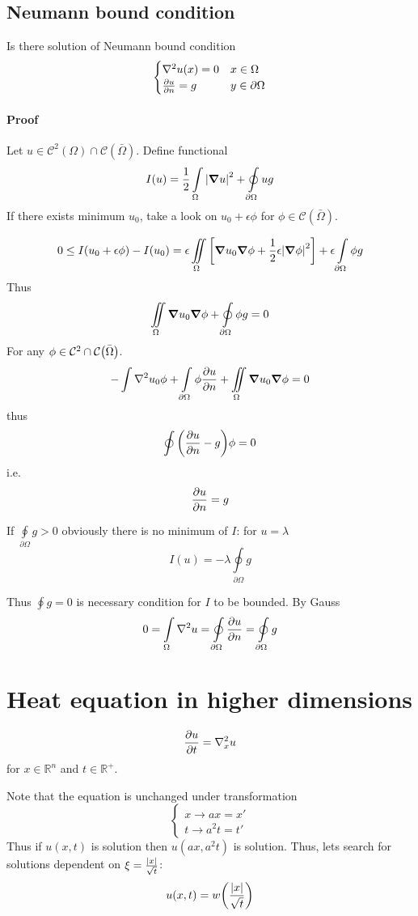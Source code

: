 \subsection{Neumann bound condition}
Is there solution of Neumann bound condition
$$\begin{cases}
\laplacian{u} (x) = 0 & x \in \Omega\\
\pdv{u}{n} (y)= g & y\in \partial \Omega
\end{cases}$$
\paragraph{Proof}
Let $ u \in \mathcal{C}^2(\Omega) \cap \mathcal{C} (\bar{\Omega})$. Define functional
$$I(u)  = \frac{1}{2} \int\limits_{\Omega} \abs{\grad{u}}^2 + \oint\limits_{\partial\Omega} ug $$ 
If there exists minimum $u_0$, take a look on $u_0 + \epsilon \phi$ for $\phi \in \mathcal{C}(\bar{\Omega})$.

$$0 \leq I(u_0+\epsilon \phi) - I(u_0) = \epsilon \iint\limits_{ \Omega} \qty[\grad{u_0} \grad{\phi} +\frac{1}{2} \epsilon\abs{\grad \phi}^2]+ \epsilon \int\limits_{\partial\Omega} \phi g $$
Thus
$$\iint\limits_{ \Omega} \grad{u_0} \grad{\phi} + \oint\limits_{ \partial \Omega} \phi g = 0$$
For any $\phi \in \mathcal{C}^2 \cap \mathcal{C}\qty(\bar{\Omega})$.
$$-\int \laplacian u_0 \phi + \int\limits_{ \partial \Omega} \phi \pdv{u}{n} + \iint\limits_{ \Omega} \grad{u_0} \grad{\phi} = 0$$
thus
$$\oint\qty(\pdv{u}{n}-g)\phi = 0$$
i.e.
$$\pdv{u}{n} = g$$




If $\oint\limits_{\partial \Omega} g>0 $ obviously there is no minimum of $I$:
for $u=\lambda$
$$I(u) = - \lambda \oint\limits_{\partial \Omega} g$$


Thus $\oint g = 0$ is necessary condition for $I$ to be bounded. By Gauss
$$0 = \int\limits_{ \Omega} \laplacian{u} = \oint\limits_{ \partial\Omega} \pdv{u}{n} = \oint\limits_{ \partial\Omega} g $$


\section{Heat equation in higher dimensions}
$$\pdv{u}{t} = \laplacian_x{u}$$
for $x\in \mathbb{R}^n$ and $t\in \mathbb{R}^+$.

Note that the equation is unchanged under transformation 
$$\begin{cases}
x \to ax= x'\\
t \to a^2t = t'
\end{cases}$$
Thus if $u(x,t)$ is solution then $u(ax, a^2t)$ is solution. Thus, lets search for solutions dependent on
$\xi = \frac{\abs{x}}{\sqrt{t}}$:
$$u(x,t) = w\qty(\frac{\abs{x}}{\sqrt{t}})$$

